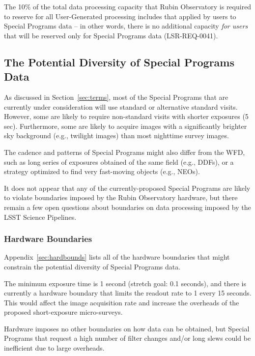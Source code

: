 \documentclass[DM,lsstdoc,toc]{lsstdoc}
\begin{document}
The 10\% of the total data processing capacity that Rubin Observatory is required to reserve for all User-Generated processing includes that applied by users to Special Programs data -- in other words, there is no additional capacity {\it for users} that will be reserved only for Special Programs data (LSR-REQ-0041).



\subsection{The Potential Diversity of Special Programs Data} \label{ssec:proc_datadiv}

As discussed in Section~\ref{sec:terms}, most of the Special Programs that are currently under consideration will use standard or alternative standard visits.
However, some are likely to require non-standard visits with shorter exposures (5 sec).
Furthermore, some are likely to acquire images with a significantly brighter sky background (e.g., twilight images) than most nighttime survey images.

The cadence and patterns of Special Programs might also differ from the WFD, such as long series of exposures obtained of the same field (e.g., DDFs), or a strategy optimized to find very fast-moving objects (e.g., NEOs).

It does not appear that any of the currently-proposed Special Programs are likely to violate boundaries imposed by the Rubin Observatory hardware, but there remain a few open questions about boundaries on data processing imposed by the LSST Science Pipelines.

\subsubsection{Hardware Boundaries}

Appendix~\ref{sec:hardbounds} lists all of the hardware boundaries that might constrain the potential diversity of Special Programs data.

The minimum exposure time is 1 second (stretch goal: 0.1 seconds), and there is currently a hardware boundary that limits the readout rate to 1 every 15 seconds.
This would affect the image acquisition rate and increase the overheads of the proposed short-exposure micro-surveys.

Hardware imposes no other boundaries on how data can be obtained, but Special Programs that request a high number of filter changes and/or long slews could be inefficient due to large overheads.
\end{document}

